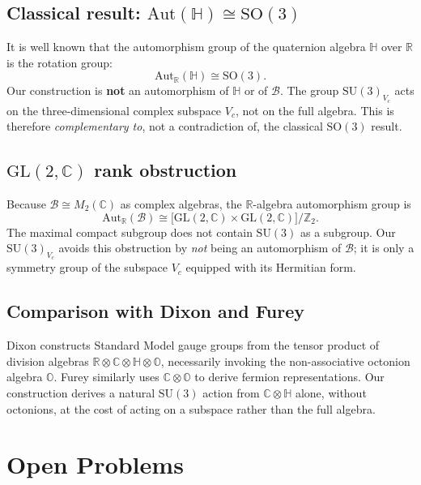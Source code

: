 \documentclass[12pt,a4paper]{article}
\theoremstyle{remark}
\begin{document}
\subsection{Classical result: $\mathrm{Aut}(\mathbb{H}) \cong \mathrm{SO}(3)$}

It is well known \cite{Porteous1995} that the automorphism group of the
quaternion algebra $\mathbb{H}$ over $\mathbb{R}$ is the rotation group:
\[
  \mathrm{Aut}_\mathbb{R}(\mathbb{H}) \cong \mathrm{SO}(3).
\]
Our construction is \textbf{not} an automorphism of $\mathbb{H}$ or of
$\mathcal{B}$.  The group $\mathrm{SU}(3)_{V_c}$ acts on the three-dimensional
complex subspace $V_c$, not on the full algebra.  This is therefore
\emph{complementary to}, not a contradiction of, the classical $\mathrm{SO}(3)$
result.

\subsection{$\mathrm{GL}(2,\mathbb{C})$ rank obstruction}

Because $\mathcal{B}\cong M_2(\mathbb{C})$ as complex algebras, the
$\mathbb{R}$-algebra automorphism group is
\[
  \mathrm{Aut}_\mathbb{R}(\mathcal{B})
  \cong \bigl[\mathrm{GL}(2,\mathbb{C})\times\mathrm{GL}(2,\mathbb{C})\bigr]/\mathbb{Z}_2.
\]
The maximal compact subgroup does not contain $\mathrm{SU}(3)$ as a subgroup.
Our $\mathrm{SU}(3)_{V_c}$ avoids this obstruction by \emph{not} being an
automorphism of $\mathcal{B}$; it is only a symmetry group of the subspace
$V_c$ equipped with its Hermitian form.

\subsection{Comparison with Dixon and Furey}

Dixon \cite{Dixon1994} constructs Standard Model gauge groups from the tensor
product of division algebras $\mathbb{R}\otimes\mathbb{C}\otimes\mathbb{H}
\otimes\mathbb{O}$, necessarily invoking the non-associative octonion algebra
$\mathbb{O}$.  Furey \cite{Furey2016} similarly uses $\mathbb{C}\otimes
\mathbb{O}$ to derive fermion representations.  Our construction derives a
natural $\mathrm{SU}(3)$ action from $\mathbb{C}\otimes\mathbb{H}$ alone,
without octonions, at the cost of acting on a subspace rather than the full
algebra.

\section{Open Problems}
\label{sec:open_problems}
\end{document}
